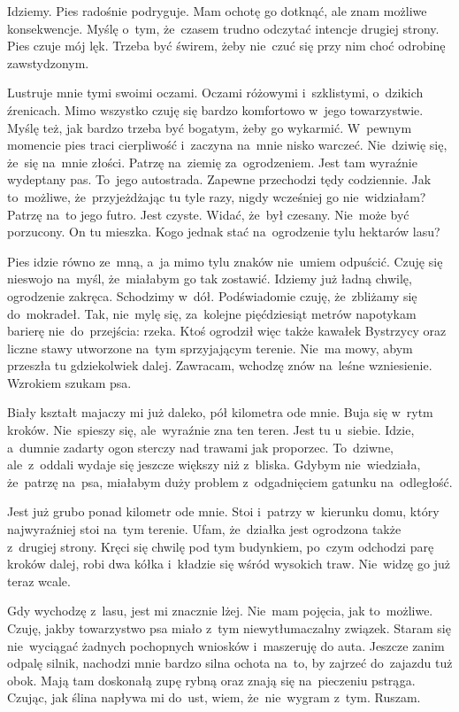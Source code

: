 \documentclass[9pt, a5paper]{memoir}
\begin{document}
Idziemy. Pies radośnie podryguje. Mam ochotę go dotknąć, ale znam możliwe konsekwencje. Myślę o~tym, że~czasem trudno odczytać intencje drugiej strony. Pies czuje mój lęk. Trzeba być świrem, żeby nie~czuć się przy nim choć odrobinę zawstydzonym.

Lustruje mnie tymi swoimi oczami. Oczami różowymi i~szklistymi, o~dzikich źrenicach. Mimo wszystko czuję się bardzo komfortowo w~jego towarzystwie. Myślę też, jak bardzo trzeba być bogatym, żeby go wykarmić. W~pewnym momencie pies traci cierpliwość i~zaczyna na~mnie nisko warczeć. Nie~dziwię się, że~się na~mnie złości. Patrzę na~ziemię za~ogrodzeniem. Jest tam wyraźnie wydeptany pas. To~jego autostrada. Zapewne przechodzi tędy codziennie. Jak to~możliwe, że~przyjeżdżając tu tyle razy, nigdy wcześniej go nie~widziałam? Patrzę na~to jego futro. Jest czyste. Widać, że~był czesany. Nie~może być porzucony. On tu mieszka. Kogo jednak stać na~ogrodzenie tylu hektarów lasu?

Pies idzie równo ze~mną, a~ja mimo tylu znaków nie~umiem odpuścić. Czuję się nieswojo na~myśl, że~miałabym go tak zostawić. Idziemy już ładną chwilę, ogrodzenie zakręca. Schodzimy w~dół. Podświadomie czuję, że~zbliżamy się do~mokradeł. Tak, nie~mylę się, za~kolejne pięćdziesiąt metrów napotykam barierę nie~do~przejścia: rzeka. Ktoś ogrodził więc także kawałek Bystrzycy oraz liczne stawy utworzone na~tym sprzyjającym terenie. Nie~ma mowy, abym przeszła tu gdziekolwiek dalej. Zawracam, wchodzę znów na~leśne wzniesienie. Wzrokiem szukam psa.

Biały kształt majaczy mi już daleko, pół kilometra ode mnie. Buja się w~rytm kroków. Nie~spieszy się, ale~wyraźnie zna ten teren. Jest tu u~siebie. Idzie, a~dumnie zadarty ogon sterczy nad trawami jak proporzec. To~dziwne, ale~z~oddali wydaje się jeszcze większy niż z~bliska. Gdybym nie~wiedziała, że~patrzę na~psa, miałabym duży problem z~odgadnięciem gatunku na~odległość.

Jest już grubo ponad kilometr ode mnie. Stoi i~patrzy w~kierunku domu, który najwyraźniej stoi na~tym terenie. Ufam, że~działka jest ogrodzona także z~drugiej strony. Kręci się chwilę pod tym budynkiem, po~czym odchodzi parę kroków dalej, robi dwa kółka i~kładzie się wśród wysokich traw. Nie~widzę go już teraz wcale.

Gdy wychodzę z~lasu, jest mi znacznie lżej. Nie~mam pojęcia, jak to~możliwe. Czuję, jakby towarzystwo psa miało z~tym niewytłumaczalny związek. Staram się nie~wyciągać żadnych pochopnych wniosków i~maszeruję do auta. Jeszcze zanim odpalę silnik, nachodzi mnie bardzo silna ochota na~to, by zajrzeć do~zajazdu tuż obok. Mają tam doskonałą zupę rybną oraz znają się na~pieczeniu pstrąga. Czując, jak ślina napływa mi do~ust, wiem, że~nie~wygram z~tym. Ruszam.
\end{document}
